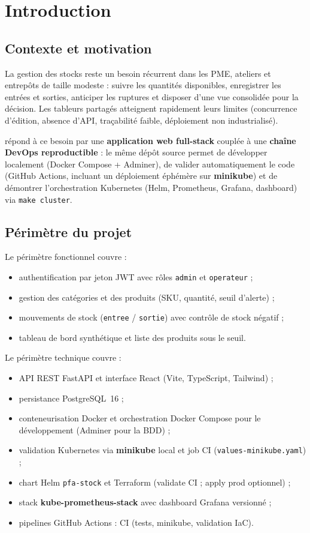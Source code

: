 \chapter{Introduction}
\label{ch:intro}

\section{Contexte et motivation}

La gestion des stocks reste un besoin récurrent dans les PME, ateliers et entrepôts de taille modeste : suivre les quantités disponibles, enregistrer les entrées et sorties, anticiper les ruptures et disposer d'une vue consolidée pour la décision. Les tableurs partagés atteignent rapidement leurs limites (concurrence d'édition, absence d'API, traçabilité faible, déploiement non industrialisé).

\stockflow{} répond à ce besoin par une \textbf{application web full-stack} couplée à une \textbf{chaîne DevOps reproductible} : le même dépôt source permet de développer localement (Docker Compose + Adminer), de valider automatiquement le code (GitHub Actions, incluant un déploiement éphémère sur \textbf{minikube}) et de démontrer l'orchestration Kubernetes (Helm, Prometheus, Grafana, dashboard) via \texttt{make cluster}.

\section{Périmètre du projet}

Le périmètre fonctionnel couvre :
\begin{itemize}
  \item authentification par jeton JWT avec rôles \texttt{admin} et \texttt{operateur} ;
  \item gestion des catégories et des produits (SKU, quantité, seuil d'alerte) ;
  \item mouvements de stock (\texttt{entree} / \texttt{sortie}) avec contrôle de stock négatif ;
  \item tableau de bord synthétique et liste des produits sous le seuil.
\end{itemize}

Le périmètre technique couvre :
\begin{itemize}
  \item API REST FastAPI et interface React (Vite, TypeScript, Tailwind) ;
  \item persistance PostgreSQL~16 ;
  \item conteneurisation Docker et orchestration Docker Compose pour le développement (Adminer pour la BDD) ;
  \item validation Kubernetes via \textbf{minikube} local et job CI (\texttt{values-minikube.yaml}) ;
  \item chart Helm \texttt{pfa-stock} et Terraform (validate CI ; apply prod optionnel) ;
  \item stack \textbf{kube-prometheus-stack} avec dashboard Grafana versionné ;
  \item pipelines GitHub Actions : CI (tests, minikube, validation IaC).
\end{itemize}

